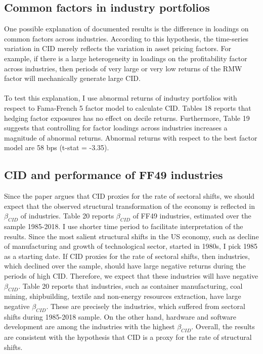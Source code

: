 \documentclass[12pt]{article}
\begin{document}
\subsection{Common factors in industry portfolios}

One possible explanation of documented results is the difference in loadings on common factors across industries. According to this hypothesis, the time-series variation in CID merely reflects the variation in asset pricing factors. For example, if there is a large heterogeneity in loadings on the profitability factor across industries, then periods of very large or very low returns of the RMW factor will mechanically generate large CID.
\paragraph{}
To test this explanation, I use abnormal returns of industry portfolios with respect to Fama-French 5 factor model to calculate CID. Tables 18 reports that hedging factor exposures has no effect on decile returns. Furthermore, Table 19 suggests that controlling for factor loadings across industries increases a magnitude of abnormal returns. Abnormal returns with respect to the best factor model are 58 bps (t-stat = -3.35). 

\subsection{CID and performance of FF49 industries}
Since the paper argues that CID proxies for the rate of sectoral shifts, we should expect that the observed structural transformation of the economy is reflected in $\beta_{CID}$ of industries. Table 20 reports $\beta_{CID}$ of FF49 industries, estimated over the sample 1985-2018. I use shorter time period to facilitate interpretation of the results. Since the most salient structural shifts in the US economy, such as decline of manufacturing and growth of technological sector, started in 1980s, I pick 1985 as a starting date. If CID proxies for the rate of sectoral shifts, then industries, which declined over the sample, should have large negative returns during the periods of high CID. Therefore, we expect that these industries will have negative $\beta_{CID}$. Table 20 reports that industries, such as container manufacturing, coal mining, shipbuilding, textile and non-energy resources extraction, have large negative $\beta_{CID}$. These are precisely the industries, which suffered from sectoral shifts during 1985-2018 sample. On the other hand, hardware and software development are among the industries with the highest $\beta_{CID}$. Overall, the results are consistent with the hypothesis that CID is a proxy for the rate of structural shifts.
\end{document}
